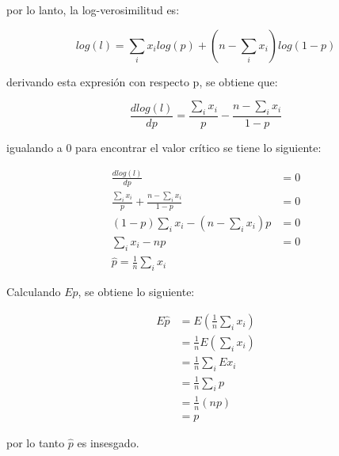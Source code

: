 \begin{enumerate}
          por lo lanto, la log-verosimilitud es:

          \begin{equation*}
              log(l) = \sum_i x_i log(p) + (n-\sum_i x_i) log(1-p)
          \end{equation*}

          derivando esta expresión con respecto p, se obtiene que:

          \begin{equation*}
              \frac{d log(l)}{dp } = \frac{\sum\limits_i x_i}{p}  - \frac{n-\sum\limits_i x_i}{1-p}
          \end{equation*}

          igualando a 0 para encontrar el valor crítico se tiene lo siguiente:

          \begin{align*}
              \frac{d log(l)}{dp }                                                                    & = 0 \\
              \frac{\sum\limits_i x_i}{p}  + \frac{n-\sum\limits_i x_i}{1-p}                          & = 0 \\
              (1-p)\sum_i x_i - (n-\sum_i x_i) p                                                      & =0  \\
              \sum_i x_i - np                                                                         & = 0 \\
              \hat{p}                                                        = \frac{1}{n} \sum_i x_i &
          \end{align*}

          Calculando $Ep$, se obtiene lo siguiente:

          \begin{align*}
              E\hat{p} & = E\left (\frac{1}{n}\sum_i x_i\right )    \\
                       & = \frac{1}{n} E \left (\sum_i x_i \right ) \\
                       & = \frac{1}{n} \sum_i E x_i                 \\
                       & = \frac{1}{n} \sum_i p                     \\
                       & = \frac{1}{n} (np)                         \\
                       & = p
          \end{align*}

          por lo tanto $\hat{p}$ es insesgado.
\end{enumerate}